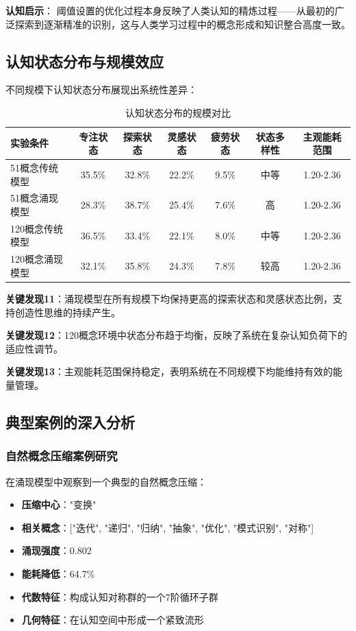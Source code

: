 \documentclass[12pt,a4paper]{article}
\begin{document}
\textbf{认知启示}：
阈值设置的优化过程本身反映了人类认知的精炼过程——从最初的广泛探索到逐渐精准的识别，这与人类学习过程中的概念形成和知识整合高度一致。

\subsection{认知状态分布与规模效应}

不同规模下认知状态分布展现出系统性差异：

\begin{table}[h]
\centering
\caption{认知状态分布的规模对比}
\label{tab:cognitive_state_scale}
\begin{tabular}{p{2.5cm}cccccc}
\toprule
\textbf{实验条件} & \textbf{专注状态} & \textbf{探索状态} & \textbf{灵感状态} & \textbf{疲劳状态} & \textbf{状态多样性} & \textbf{主观能耗范围} \\
\midrule
51概念传统模型 & 35.5\% & 32.8\% & 22.2\% & 9.5\% & 中等 & 1.20-2.36 \\
51概念涌现模型 & 28.3\% & 38.7\% & 25.4\% & 7.6\% & 高 & 1.20-2.36 \\
120概念传统模型 & 36.5\% & 33.4\% & 22.1\% & 8.0\% & 中等 & 1.20-2.36 \\
120概念涌现模型 & 32.1\% & 35.8\% & 24.3\% & 7.8\% & 较高 & 1.20-2.36 \\
\bottomrule
\end{tabular}
\end{table}

\textbf{关键发现11}：涌现模型在所有规模下均保持更高的探索状态和灵感状态比例，支持创造性思维的持续产生。

\textbf{关键发现12}：120概念环境中状态分布趋于均衡，反映了系统在复杂认知负荷下的适应性调节。

\textbf{关键发现13}：主观能耗范围保持稳定，表明系统在不同规模下均能维持有效的能量管理。

\subsection{典型案例的深入分析}

\subsubsection{自然概念压缩案例研究}

在涌现模型中观察到一个典型的自然概念压缩：
\begin{itemize}
\item \textbf{压缩中心}："变换"
\item \textbf{相关概念}：["迭代", "递归", "归纳", "抽象", "优化", "模式识别", "对称"]
\item \textbf{涌现强度}：0.802
\item \textbf{能耗降低}：64.7\%
\item \textbf{代数特征}：构成认知对称群的一个7阶循环子群
\item \textbf{几何特征}：在认知空间中形成一个紧致流形
\end{itemize}
\end{document}
